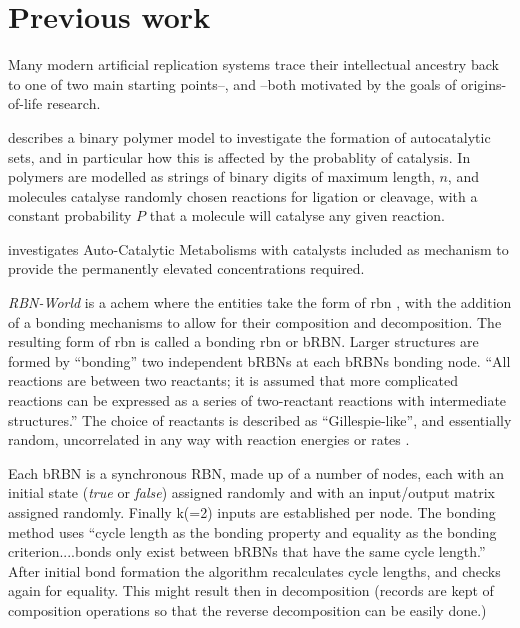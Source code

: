 \section{Previous work}\label{previous-work}

Many modern artificial replication systems trace their intellectual ancestry back to one of two main starting points--\cite{Kauffman1986}, and \cite{Bagley1991}--both motivated by the goals of origins-of-life research.

 describes a binary polymer model to investigate the formation of autocatalytic sets, and in particular how this is affected by the probablity of catalysis. In \citeauthor{Kauffman1986} polymers are modelled as strings of binary digits of maximum length, $n$, and molecules catalyse randomly chosen reactions for ligation or cleavage, with a constant probability $P$ that a molecule will catalyse any given reaction.

 investigates Auto-Catalytic Metabolisms with catalysts included as mechanism to provide the permanently elevated concentrations required.

\emph{RBN-World} \parencite{Faulconbridge2011} is a \gls{achem} where the entities take the form of \gls{rbn} \parencite{Kauffman:1969ne}, with the addition of a bonding mechanisms to allow for their composition and decomposition. The resulting form of \gls{rbn} is called a bonding \gls{rbn} or bRBN.  Larger structures are formed by ``bonding'' two independent bRBNs at each bRBNs bonding node. ``All reactions are between two reactants; it is assumed that more complicated reactions can be expressed as a series of two-reactant reactions with intermediate structures.'' The choice of reactants is described as ``Gillespie-like'', and essentially random, uncorrelated in any way with reaction energies or rates \parencite[chap.8]{Faulconbridge2011}.

Each bRBN is a synchronous RBN, made up of a number of nodes, each with an initial state (\emph{true} or \emph{false}) assigned randomly and with an input/output matrix assigned randomly. Finally k(=2) inputs are established per node. The bonding method uses ``cycle length as the bonding property and equality as the bonding criterion....bonds only exist between bRBNs that have the same cycle length.'' After initial bond formation the algorithm recalculates cycle lengths, and checks again for equality. This might result then in decomposition (records are kept of composition operations so that the reverse decomposition can be easily done.)

